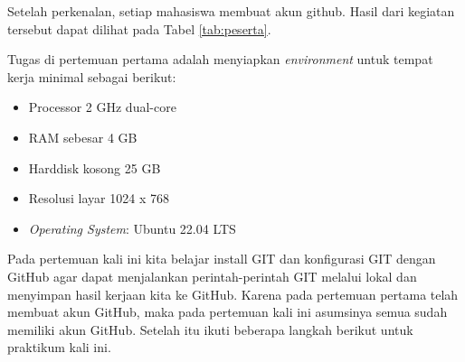 \documentclass[a4paper]{tufte-handout}
\begin{document}
\vspace*{.5cm}
Setelah perkenalan, setiap mahasiswa membuat akun github. Hasil dari kegiatan tersebut dapat dilihat pada Tabel \ref{tab:peserta}.

Tugas di pertemuan pertama adalah menyiapkan \textit{environment} untuk tempat kerja minimal sebagai berikut:
\begin{multicols}{2}
\begin{itemize}
\setlength\itemsep{0em}
\item Processor 2 GHz dual-core
\item RAM sebesar 4 GB
\item Harddisk kosong 25 GB
\item Resolusi layar 1024 x 768
\item \textit{Operating System}: Ubuntu 22.04 LTS
\end{itemize}
\end{multicols}
\hrulefill

\clearpage
{}


Pada pertemuan kali ini kita belajar install GIT dan konfigurasi GIT dengan GitHub agar dapat menjalankan perintah-perintah GIT melalui lokal dan menyimpan hasil kerjaan kita ke GitHub. Karena pada pertemuan pertama telah membuat akun GitHub, maka pada pertemuan kali ini asumsinya semua sudah memiliki akun GitHub. Setelah itu ikuti beberapa langkah berikut untuk praktikum kali ini.
\end{document}
